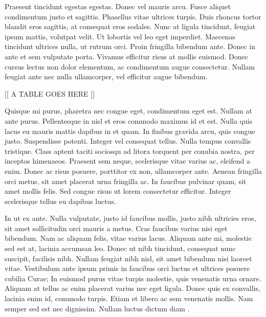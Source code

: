 Praesent tincidunt egestas egestas. Donec vel mauris arcu. Fusce aliquet
condimentum justo et sagittis. Phasellus vitae ultrices turpis. Duis rhoncus
tortor blandit eros sagittis, at consequat eros sodales. Nunc at ligula
tincidunt, feugiat ipsum mattis, volutpat velit. Ut lobortis vel leo eget
imperdiet. Maecenas tincidunt ultrices nulla, ut rutrum orci. Proin fringilla
bibendum ante. Donec in ante et sem vulputate porta. Vivamus efficitur risus at
mollis euismod. Donec cursus lectus non dolor elementum, ac condimentum augue
consectetur. Nullam feugiat ante nec nulla ullamcorper, vel efficitur augue
bibendum.

\begin{table}
  \begin{center}
    [[ A TABLE GOES HERE ]]
  \end{center}
  \caption[A short caption for the list of tables]{A long table caption.}
  \label{tab:tribool}
\end{table}

Quisque mi purus, pharetra nec congue eget, condimentum eget est. Nullam at ante
purus. Pellentesque in nisl et eros commodo maximus id et est. Nulla quis lacus
eu mauris mattis dapibus in et quam. In finibus gravida arcu, quis congue
justo. Suspendisse potenti. Integer vel consequat tellus. Nulla tempus convallis
tristique. Class aptent taciti sociosqu ad litora torquent per conubia nostra,
per inceptos himenaeos. Praesent sem neque, scelerisque vitae varius ac,
eleifend a enim. Donec ac risus posuere, porttitor ex non, ullamcorper
ante. Aenean fringilla orci metus, sit amet placerat urna fringilla ac. In
faucibus pulvinar quam, sit amet mollis felis. Sed congue risus ut lorem
consectetur efficitur. Integer scelerisque tellus eu dapibus luctus.

In ut ex ante. Nulla vulputate, justo id faucibus mollis, justo nibh ultricies
eros, sit amet sollicitudin orci mauris a metus. Cras faucibus varius nisi eget
bibendum. Nam ac aliquam felis, vitae varius lacus. Aliquam ante mi, molestie
sed est at, lacinia accumsan leo. Donec ut nibh tincidunt, consequat nunc
suscipit, facilisis nibh. Nullam feugiat nibh nisl, sit amet bibendum nisi
laoreet vitae. Vestibulum ante ipsum primis in faucibus orci luctus et ultrices
posuere cubilia Curae; In euismod purus vitae turpis molestie, quis venenatis
urna ornare. Aliquam at tellus ac enim placerat varius nec eget ligula. Donec
quis ex convallis, lacinia enim id, commodo turpis. Etiam et libero ac sem
venenatis mollis. Nam semper sed est nec dignissim. Nullam luctus dictum diam
.
